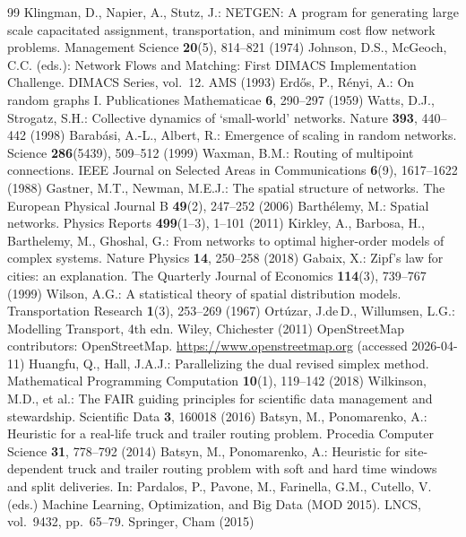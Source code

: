 \documentclass[runningheads]{llncs}
\begin{document}
\begin{thebibliography}{99}
 Klingman, D., Napier, A., Stutz, J.: NETGEN: A program for
generating large scale capacitated assignment, transportation, and minimum cost
flow network problems. Management Science \textbf{20}(5), 814--821 (1974)
 Johnson, D.S., McGeoch, C.C. (eds.): Network Flows and Matching:
First DIMACS Implementation Challenge. DIMACS Series, vol.~12. AMS (1993)
 Erd\H{o}s, P., R\'enyi, A.: On random graphs I. Publicationes
Mathematicae \textbf{6}, 290--297 (1959)
 Watts, D.J., Strogatz, S.H.: Collective dynamics of `small-world'
networks. Nature \textbf{393}, 440--442 (1998)
 Barab\'asi, A.-L., Albert, R.: Emergence of scaling in random
networks. Science \textbf{286}(5439), 509--512 (1999)
 Waxman, B.M.: Routing of multipoint connections. IEEE Journal
on Selected Areas in Communications \textbf{6}(9), 1617--1622 (1988)
 Gastner, M.T., Newman, M.E.J.: The spatial structure of
networks. The European Physical Journal B \textbf{49}(2), 247--252 (2006)
 Barth\'elemy, M.: Spatial networks. Physics Reports
\textbf{499}(1--3), 1--101 (2011)
 Kirkley, A., Barbosa, H., Barthelemy, M., Ghoshal, G.: From
networks to optimal higher-order models of complex systems. Nature Physics
\textbf{14}, 250--258 (2018)
 Gabaix, X.: Zipf's law for cities: an explanation. The
Quarterly Journal of Economics \textbf{114}(3), 739--767 (1999)
 Wilson, A.G.: A statistical theory of spatial distribution
models. Transportation Research \textbf{1}(3), 253--269 (1967)
 Ortúzar, J.de\,D., Willumsen, L.G.: Modelling Transport, 4th
edn. Wiley, Chichester (2011)
 OpenStreetMap contributors: OpenStreetMap.
\url{https://www.openstreetmap.org} (accessed 2026-04-11)
 Huangfu, Q., Hall, J.A.J.: Parallelizing the dual revised simplex
method. Mathematical Programming Computation \textbf{10}(1), 119--142 (2018)
 Wilkinson, M.D., et al.: The FAIR guiding principles for
scientific data management and stewardship. Scientific Data \textbf{3}, 160018
(2016)
 Batsyn, M., Ponomarenko, A.: Heuristic for a real-life
truck and trailer routing problem. Procedia Computer Science \textbf{31},
778--792 (2014)
 Batsyn, M., Ponomarenko, A.: Heuristic for
site-dependent truck and trailer routing problem with soft and hard time windows
and split deliveries. In: Pardalos, P., Pavone, M., Farinella, G.M., Cutello, V.
(eds.) Machine Learning, Optimization, and Big Data (MOD 2015). LNCS, vol.~9432,
pp.~65--79. Springer, Cham (2015)
\end{thebibliography}
\end{document}
